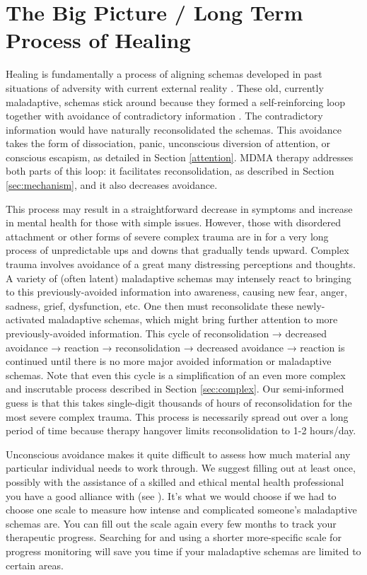 \documentclass[12pt,letterpaper]{book}
\begin{document}
\section{The Big Picture / Long Term Process of Healing}
\label{bigPicture}
Healing is fundamentally a process of aligning schemas developed in past situations of adversity with current external reality \cite{eckerUnlocking}. These old, currently maladaptive, schemas stick around because they formed a self-reinforcing loop together with avoidance of contradictory information \cite{berghSelfEvidencing}. The contradictory information would have naturally reconsolidated the schemas. This avoidance takes the form of dissociation, panic, unconscious diversion of attention, or conscious escapism, as detailed in Section \ref{attention}. MDMA therapy addresses both parts of this loop: it facilitates reconsolidation, as described in Section \ref{sec:mechanism}, and it also decreases avoidance.

This process may result in a straightforward decrease in symptoms and increase in mental health for those with simple issues. However, those with disordered attachment or other forms of severe complex trauma are in for a very long process of unpredictable ups and downs that gradually tends upward. Complex trauma involves avoidance of a great many distressing perceptions and thoughts. A variety of (often latent) maladaptive schemas may intensely react to bringing to this previously-avoided information into awareness, causing new fear, anger, sadness, grief, dysfunction, etc. One then must reconsolidate these newly-activated maladaptive schemas, which might bring further attention to more previously-avoided information. This cycle of reconsolidation → decreased avoidance → reaction → reconsolidation → decreased avoidance → reaction is continued until there is no more major avoided information or maladaptive schemas. Note that even this cycle is a simplification of an even more complex and inscrutable process described in Section \ref{sec:complex}. Our semi-informed guess is that this takes single-digit thousands of hours of reconsolidation for the most severe complex trauma. This process is necessarily spread out over a long period of time because therapy hangover limits reconsolidation to 1-2 hours/day.

Unconscious avoidance makes it quite difficult to assess how much material any particular individual needs to work through. We suggest filling out \textcite{maladaptiveSchemaScale} at least once, possibly with the assistance of a skilled and ethical mental health professional you have a good alliance with (see \textcite{BRWAIdownload}). It's what we would choose if we had to choose one scale to measure how intense and complicated someone's maladaptive schemas are. You can fill out the scale again every few months to track your therapeutic progress. Searching for and using a shorter more-specific scale for progress monitoring will save you time if your maladaptive schemas are limited to certain areas.
\end{document}
